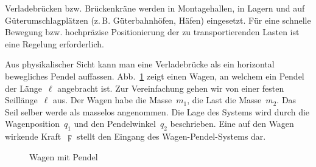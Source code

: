 Verladebrücken bzw. Brückenkräne werden in Montagehallen, in Lagern
und auf Güterumschlagplätzen (z.\,B. Güterbahnhöfen, Häfen) eingesetzt.
Für eine schnelle Bewegung bzw. hochpräzise Positionierung der zu
transportierenden Lasten ist eine Regelung erforderlich.

Aus physikalischer Sicht kann man eine Verladebrücke als ein horizontal
bewegliches Pendel auffassen. Abb.~\ref{fig:Wagen-mit-Pendel} zeigt
einen Wagen, an welchem ein Pendel der Länge~$\ell$ angebracht ist.
Zur Vereinfachung gehen wir von einer festen Seillänge~$\ell$ aus.
Der Wagen habe die Masse~$m_{1}$, die Last die Masse~$m_{2}$.
Das Seil selber werde als masselos angenommen. Die Lage des Systems
wird durch die Wagenposition~$q_{1}$ und den Pendelwinkel~$q_{2}$
beschrieben. Eine auf den Wagen wirkende Kraft~$\digamma$ stellt
den Eingang des Wagen-Pendel-Systems dar.

\begin{figure}
\begin{centering}
\resizebox{0.5\textwidth}{!}{}
\par\end{centering}
\caption{Wagen mit Pendel\label{fig:Wagen-mit-Pendel}}

\end{figure}

